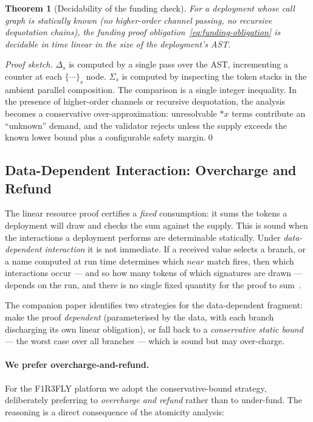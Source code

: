 \documentclass[11pt,a4paper]{article}
\newtheorem{theorem}{Theorem}[section]
\newcommand{\drop}[1]{{\ast} #1}
\newcommand{\signed}[2]{\{#1\}_{#2}}
\begin{document}
\begin{theorem}[Decidability of the funding check]
  \label{thm:decidability}
  For a deployment whose call graph is statically known (no
  higher-order channel passing, no recursive dequotation
  chains), the funding proof
  obligation~\eqref{eq:funding-obligation} is decidable in
  time linear in the size of the deployment's AST.
\end{theorem}

\noindent
\textit{Proof sketch.}  $\Delta_s$ is computed by a single
pass over the AST, incrementing a counter at each
$\signed{\cdots}{s}$ node.  $\Sigma_s$ is computed by
inspecting the token stacks in the ambient parallel
composition.  The comparison is a single integer inequality.
In the presence of higher-order channels or recursive
dequotation, the analysis becomes a conservative
over-approximation: unresolvable $\drop{x}$ terms contribute
an ``unknown'' demand, and the validator rejects unless the
supply exceeds the known lower bound plus a configurable
safety margin.\qed

\subsection{Data-Dependent Interaction: Overcharge and Refund}
\label{sec:data-dependent}

The linear resource proof certifies a \emph{fixed}
consumption: it sums the tokens a deployment will draw and
checks the sum against the supply.  This is sound when the
interactions a deployment performs are determinable
statically.  Under \emph{data-dependent interaction} it is
not immediate.  If a received value selects a branch, or a
name computed at run time determines which $\mathit{near}$
match fires, then which interactions occur --- and so how many
tokens of which signatures are drawn --- depends on the run,
and there is no single fixed quantity for the proof to
sum~\cite{CostEndofunctor}.

The companion paper identifies two strategies for the
data-dependent fragment: make the proof \emph{dependent}
(parameterised by the data, with each branch discharging its
own linear obligation), or fall back to a \emph{conservative
static bound} --- the worst case over all branches --- which
is sound but may over-charge.

\paragraph{We prefer overcharge-and-refund.}
For the F1R3FLY platform we adopt the conservative-bound
strategy, deliberately preferring to \emph{overcharge and
refund} rather than to under-fund.  The reasoning is a direct
consequence of the atomicity analysis:
\end{document}
